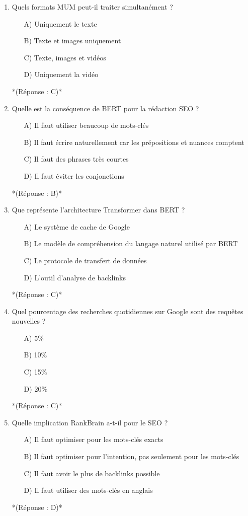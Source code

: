 \documentclass[12pt,a4paper,twoside]{report}
\begin{document}
\begin{enumerate}
\item Quels formats MUM peut-il traiter simultanément ?
\begin{itemize}
\item[A)] Uniquement le texte
\item[B)] Texte et images uniquement
\item[C)] Texte, images et vidéos
\item[D)] Uniquement la vidéo
\end{itemize}
*(Réponse : C)*

\item Quelle est la conséquence de BERT pour la rédaction SEO ?
\begin{itemize}
\item[A)] Il faut utiliser beaucoup de mots-clés
\item[B)] Il faut écrire naturellement car les prépositions et nuances comptent
\item[C)] Il faut des phrases très courtes
\item[D)] Il faut éviter les conjonctions
\end{itemize}
*(Réponse : B)*

\item Que représente l'architecture Transformer dans BERT ?
\begin{itemize}
\item[A)] Le système de cache de Google
\item[B)] Le modèle de compréhension du langage naturel utilisé par BERT
\item[C)] Le protocole de transfert de données
\item[D)] L'outil d'analyse de backlinks
\end{itemize}
*(Réponse : C)*

\item Quel pourcentage des recherches quotidiennes sur Google sont des requêtes nouvelles ?
\begin{itemize}
\item[A)] 5\%
\item[B)] 10\%
\item[C)] 15\%
\item[D)] 20\%
\end{itemize}
*(Réponse : C)*

\item Quelle implication RankBrain a-t-il pour le SEO ?
\begin{itemize}
\item[A)] Il faut optimiser pour les mots-clés exacts
\item[B)] Il faut optimiser pour l'intention, pas seulement pour les mots-clés
\item[C)] Il faut avoir le plus de backlinks possible
\item[D)] Il faut utiliser des mots-clés en anglais
\end{itemize}
*(Réponse : D)*


\end{enumerate}
\end{document}
